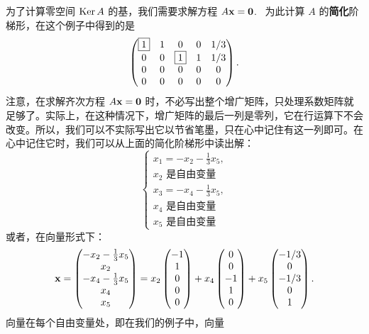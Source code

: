 为了计算零空间 $\operatorname{Ker} A$ 的基，我们需要求解方程 $A \mathbf{x} = \mathbf{0}$. ~为此计算 $A$ 的\textbf{简化}阶梯形，在这个例子中得到的是
$$
\begin{pmatrix}
\fbox{$1$} & 1 & 0 & 0 & 1/3 \\
0 & 0 & \fbox{$1$} & 1 & 1/3 \\
0 & 0 & 0 & 0 & 0 \\
0 & 0 & 0 & 0 & 0
\end{pmatrix}.
$$
注意，在求解齐次方程 $A \mathbf{x} = \mathbf{0}$ 时，不必写出整个增广矩阵，只处理系数矩阵就足够了。实际上，在这种情况下，增广矩阵的最后一列是零列，它在行运算下不会改变。所以，我们可以不实际写出它以节省笔墨，只在心中记住有这一列即可。在心中记住它时，我们可以从上面的简化阶梯形中读出解：
$$
\begin{cases}
x_1 = -x_2 - \frac{1}{3} x_5,\\
x_2 \text{ 是自由变量} \\
x_3 = -x_4 - \frac{1}{3} x_5 ,\\
x_4 \text{ 是自由变量} \\
x_5  \text{ 是自由变量}
\end{cases}
$$
或者，在向量形式下：
\begin{equation}\label{eq:02-07-01}
\mathbf{x} = \begin{pmatrix} -x_2 - \frac{1}{3} x_5 \\ x_2 \\ -x_4 - \frac{1}{3} x_5 \\ x_4 \\ x_5 \end{pmatrix} = x_2 \begin{pmatrix} -1 \\ 1 \\ 0 \\ 0 \\ 0 \end{pmatrix} + x_4 \begin{pmatrix} 0 \\ 0 \\ -1 \\ 1 \\ 0 \end{pmatrix} + x_5 \begin{pmatrix} -1/3 \\ 0 \\ -1/3 \\ 0 \\ 1 \end{pmatrix}.
\end{equation}
向量在每个自由变量处，即在我们的例子中，向量
